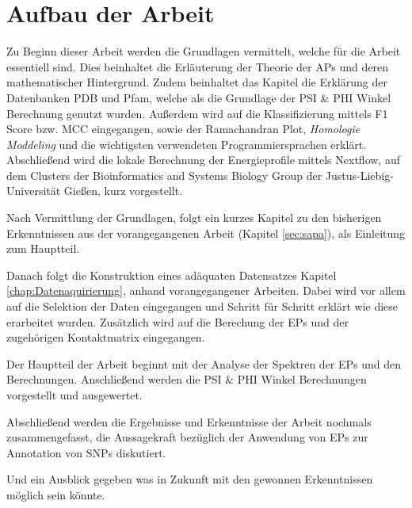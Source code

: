 \section{Aufbau der Arbeit}

Zu Beginn dieser Arbeit werden die Grundlagen vermittelt, welche für die Arbeit essentiell sind. Dies beinhaltet die Erläuterung der Theorie der \ac{APs} und deren mathematischer Hintergrund. Zudem beinhaltet das Kapitel die Erklärung der Datenbanken \ac{PDB} und \ac{Pfam}, welche als die Grundlage der PSI \& PHI Winkel Berechnung genutzt wurden. 
Außerdem wird auf die Klassifizierung mittels F1 Score bzw. \ac{MCC} eingegangen, sowie der Ramachandran Plot, \emph{Homologie Moddeling} und die wichtigsten verwendeten Programmiersprachen
erklärt. Abschließend wird die lokale Berechnung der Energieprofile mittels Nextflow, auf dem Clusters der Bioinformatics and Systems Biology Group der Justus-Liebig-Universität Gießen, kurz vorgestellt.

Nach Vermittlung der Grundlagen, folgt ein kurzes Kapitel zu den bisherigen Erkenntnissen aus der vorangegangenen Arbeit (Kapitel \ref{sec:sapa}), als Einleitung zum Hauptteil.

Danach folgt die Konstruktion eines adäquaten Datensatzes Kapitel \ref{chap:Datenaquirierung}, anhand vorangegangener Arbeiten\cite{Mathias.2014}. Dabei wird vor allem auf die Selektion der Daten eingegangen und Schritt für Schritt erklärt wie diese erarbeitet wurden. Zusätzlich wird auf die Berechung der \ac{EP}s und der zugehörigen Kontaktmatrix eingegangen.

Der Hauptteil der Arbeit beginnt mit der Analyse der Spektren der \ac{EP}s und den Berechnungen. Anschließend werden die PSI \& PHI Winkel Berechnungen vorgestellt und ausgewertet.



Abschließend werden die Ergebnisse und Erkenntnisse der Arbeit nochmals zusammengefasst, die Aussagekraft bezüglich der Anwendung von \ac{EP}s zur Annotation von \ac{SNP}s diskutiert.

Und ein Ausblick gegeben was in Zukunft mit den gewonnen Erkenntnissen möglich sein könnte.


